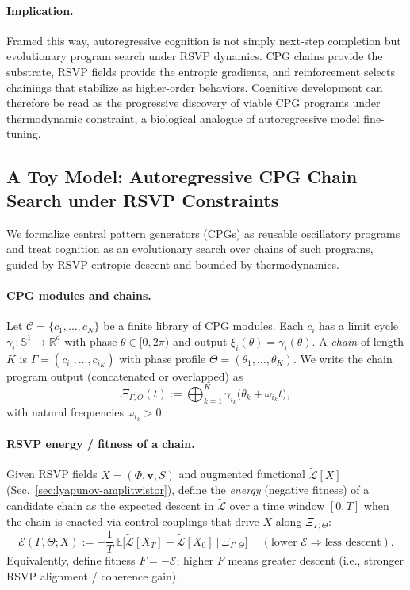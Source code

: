 \documentclass[a4paper,11pt]{article}
\begin{document}
\paragraph{Implication.}
Framed this way, autoregressive cognition is not simply next-step completion
but evolutionary program search under RSVP dynamics. CPG chains provide the
substrate, RSVP fields provide the entropic gradients, and reinforcement
selects chainings that stabilize as higher-order behaviors. Cognitive
development can therefore be read as the progressive discovery of viable CPG
programs under thermodynamic constraint, a biological analogue of autoregressive
model fine-tuning.

\subsection{A Toy Model: Autoregressive CPG Chain Search under RSVP Constraints}
\label{sec:cpg-evo}

We formalize central pattern generators (CPGs) as reusable oscillatory
programs and treat cognition as an evolutionary search over chains of such
programs, guided by RSVP entropic descent and bounded by thermodynamics.

\paragraph{CPG modules and chains.}
Let $\mathcal{C}=\{c_1,\dots,c_N\}$ be a finite library of CPG modules.
Each $c_i$ has a limit cycle $\gamma_i:\mathbb{S}^1\!\to\!\mathbb{R}^d$
with phase $\theta\in[0,2\pi)$ and output $\xi_i(\theta)=\gamma_i(\theta)$.
A \emph{chain} of length $K$ is $\Gamma=(c_{i_1},\dots,c_{i_K})$ with
phase profile $\Theta=(\theta_1,\dots,\theta_K)$.
We write the chain program output (concatenated or overlapped) as
\[
\Xi_{\Gamma,\Theta}(t):=\bigoplus_{k=1}^K \gamma_{i_k}\!\big(\theta_k+ \omega_{i_k} t\big),
\]
with natural frequencies $\omega_{i_k}>0$.

\paragraph{RSVP energy / fitness of a chain.}
Given RSVP fields $X=(\Phi,\mathbf{v},S)$ and augmented functional
$\widetilde{\mathcal{L}}[X]$ (Sec.~\ref{sec:lyapunov-amplitwistor}), define
the \emph{energy} (negative fitness) of a candidate chain as the expected descent
in $\widetilde{\mathcal{L}}$ over a time window $[0,T]$ when the chain is enacted
via control couplings that drive $X$ along $\Xi_{\Gamma,\Theta}$:
\begin{equation}
\label{eq:cpg-energy}
\mathcal{E}(\Gamma,\Theta;X)
:=
-\frac{1}{T}\,\mathbb{E}\Big[\widetilde{\mathcal{L}}[X_T]-\widetilde{\mathcal{L}}[X_0]\ \big|\ \Xi_{\Gamma,\Theta}\Big]
\quad\ (\text{lower }\mathcal{E} \Rightarrow \text{less descent}).
\end{equation}
Equivalently, define fitness $F=-\mathcal{E}$; higher $F$ means greater descent
(i.e., stronger RSVP alignment / coherence gain).
\end{document}
